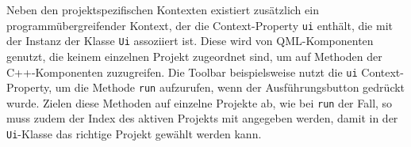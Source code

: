 Neben den projektspezifischen Kontexten existiert zusätzlich ein
programmübergreifender Kontext, der die Context-Property \texttt{ui} enthält,
die mit der Instanz der Klasse \texttt{Ui} assoziiert ist. Diese wird von
QML-Komponenten genutzt, die keinem einzelnen Projekt zugeordnet sind, um auf
Methoden der C++-Komponenten zuzugreifen. Die Toolbar beispielsweise nutzt die
\texttt{ui} Context-Property, um die Methode \texttt{run} aufzurufen, wenn der
Ausführungsbutton gedrückt wurde. Zielen diese Methoden auf einzelne Projekte
ab, wie bei \texttt{run} der Fall, so muss zudem der Index des aktiven Projekts
mit angegeben werden, damit in der \texttt{Ui}-Klasse das richtige Projekt
gewählt werden kann.
